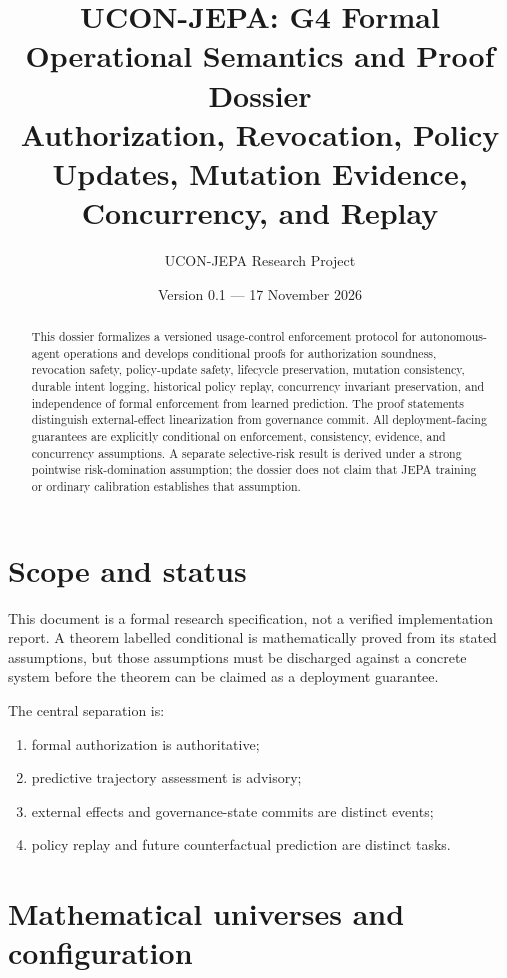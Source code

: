 \documentclass[11pt,a4paper]{article}
\title{UCON-JEPA: G4 Formal Operational Semantics and Proof Dossier\\
\large Authorization, Revocation, Policy Updates, Mutation Evidence, Concurrency, and Replay}
\author{UCON-JEPA Research Project}
\date{Version 0.1 --- 17 November 2026}
\theoremstyle{remark}
\begin{document}
\maketitle

\begin{abstract}
This dossier formalizes a versioned usage-control enforcement protocol for autonomous-agent operations and develops conditional proofs for authorization soundness, revocation safety, policy-update safety, lifecycle preservation, mutation consistency, durable intent logging, historical policy replay, concurrency invariant preservation, and independence of formal enforcement from learned prediction. The proof statements distinguish external-effect linearization from governance commit. All deployment-facing guarantees are explicitly conditional on enforcement, consistency, evidence, and concurrency assumptions. A separate selective-risk result is derived under a strong pointwise risk-domination assumption; the dossier does not claim that JEPA training or ordinary calibration establishes that assumption.
\end{abstract}

\tableofcontents

\section{Scope and status}

This document is a formal research specification, not a verified implementation report. A theorem labelled conditional is mathematically proved from its stated assumptions, but those assumptions must be discharged against a concrete system before the theorem can be claimed as a deployment guarantee.

The central separation is:
\begin{enumerate}[label=(\arabic*)]
  \item formal authorization is authoritative;
  \item predictive trajectory assessment is advisory;
  \item external effects and governance-state commits are distinct events;
  \item policy replay and future counterfactual prediction are distinct tasks.
\end{enumerate}

\section{Mathematical universes and configuration}
\end{document}
